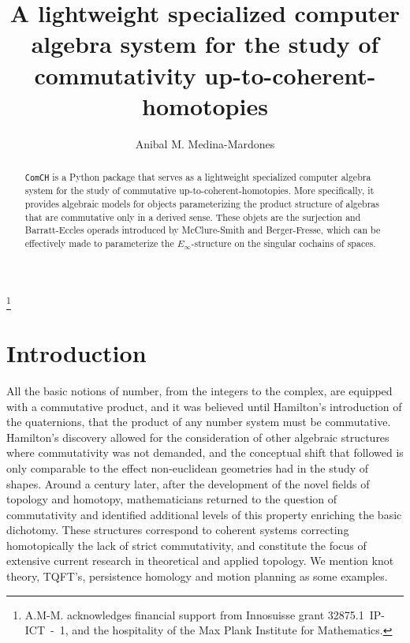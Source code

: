 \documentclass{amsart}
\begin{document}
\title{A lightweight specialized computer algebra system for the study of commutativity up-to-coherent-homotopies}
\author{Anibal M. Medina-Mardones}
\address{Department of Mathematics, University of Notre Dame du Lac, Notre Dame, IN, USA}
\thanks{A.M-M. acknowledges financial support from Innosuisse grant \mbox{32875.1 IP-ICT - 1}, and the hospitality of the Max Plank Institute for Mathematics.}

\begin{abstract}
	\texttt{ComCH} is a Python package that serves as a lightweight specialized computer algebra system for the study of commutative up-to-coherent-homotopies. More specifically, it provides algebraic models for objects parameterizing the product structure of algebras that are commutative only in a derived sense. These objets are the surjection and Barratt-Eccles operads introduced by McClure-Smith and Berger-Fresse, which can be effectively made to parameterize the $E_\infty$-structure on the singular cochains of spaces.
\end{abstract} 

\maketitle

\section{Introduction}

All the basic notions of number, from the integers to the complex, are equipped with a commutative product, and it was believed until Hamilton's introduction of the quaternions, that the product of any number system must be commutative. Hamilton's discovery allowed for the consideration of other algebraic structures where commutativity was not demanded, and the conceptual shift that followed is only comparable to the effect non-euclidean geometries had in the study of shapes. Around a century later, after the development of the novel fields of topology and homotopy, mathematicians returned to the question of commutativity and identified additional levels of this property enriching the basic dichotomy. These structures correspond to coherent systems correcting homotopically the lack of strict commutativity, and constitute the focus of extensive current research in theoretical and applied topology. We mention knot theory, TQFT's, persistence homology and motion planning as some examples.
\end{document}
